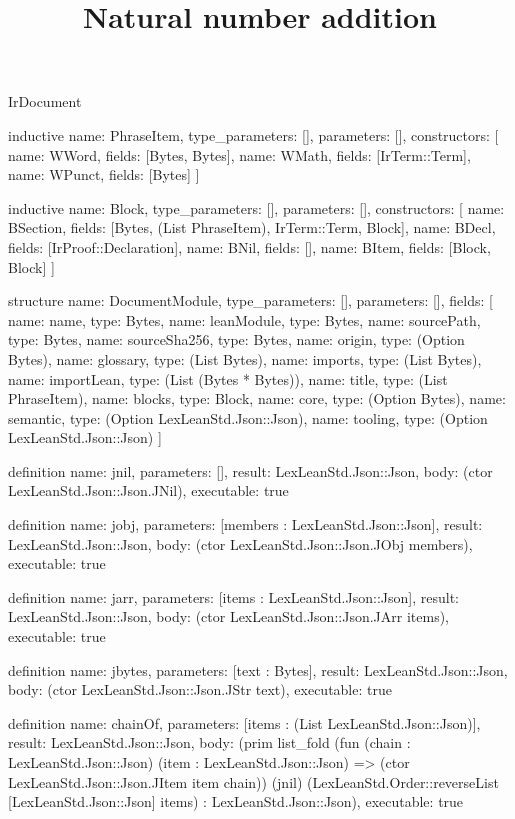 \begin{lexlean}{IrDocument}
\title{Natural number addition}
\begin{semanticmodule}
inductive{
  name: PhraseItem,
  type_parameters: [],
  parameters: [],
  constructors: [
    {name: WWord, fields: [Bytes, Bytes]},
    {name: WMath, fields: [IrTerm::Term]},
    {name: WPunct, fields: [Bytes]}
  ]
}

inductive{
  name: Block,
  type_parameters: [],
  parameters: [],
  constructors: [
    {name: BSection, fields: [Bytes, (List PhraseItem), IrTerm::Term, Block]},
    {name: BDecl, fields: [IrProof::Declaration]},
    {name: BNil, fields: []},
    {name: BItem, fields: [Block, Block]}
  ]
}

structure{
  name: DocumentModule,
  type_parameters: [],
  parameters: [],
  fields: [
    {name: name, type: Bytes},
    {name: leanModule, type: Bytes},
    {name: sourcePath, type: Bytes},
    {name: sourceSha256, type: Bytes},
    {name: origin, type: (Option Bytes)},
    {name: glossary, type: (List Bytes)},
    {name: imports, type: (List Bytes)},
    {name: importLean, type: (List (Bytes * Bytes))},
    {name: title, type: (List PhraseItem)},
    {name: blocks, type: Block},
    {name: core, type: (Option Bytes)},
    {name: semantic, type: (Option LexLeanStd.Json::Json)},
    {name: tooling, type: (Option LexLeanStd.Json::Json)}
  ]
}

definition{
  name: jnil,
  parameters: [],
  result: LexLeanStd.Json::Json,
  body: (ctor LexLeanStd.Json::Json.JNil),
  executable: true
}

definition{
  name: jobj,
  parameters: [members : LexLeanStd.Json::Json],
  result: LexLeanStd.Json::Json,
  body: (ctor LexLeanStd.Json::Json.JObj members),
  executable: true
}

definition{
  name: jarr,
  parameters: [items : LexLeanStd.Json::Json],
  result: LexLeanStd.Json::Json,
  body: (ctor LexLeanStd.Json::Json.JArr items),
  executable: true
}

definition{
  name: jbytes,
  parameters: [text : Bytes],
  result: LexLeanStd.Json::Json,
  body: (ctor LexLeanStd.Json::Json.JStr text),
  executable: true
}

definition{
  name: chainOf,
  parameters: [items : (List LexLeanStd.Json::Json)],
  result: LexLeanStd.Json::Json,
  body: (prim list_fold (fun (chain : LexLeanStd.Json::Json) (item : LexLeanStd.Json::Json) => (ctor LexLeanStd.Json::Json.JItem item chain)) (jnil) (LexLeanStd.Order::reverseList [LexLeanStd.Json::Json] items) : LexLeanStd.Json::Json),
  executable: true
}


\end{semanticmodule}
\end{lexlean}
